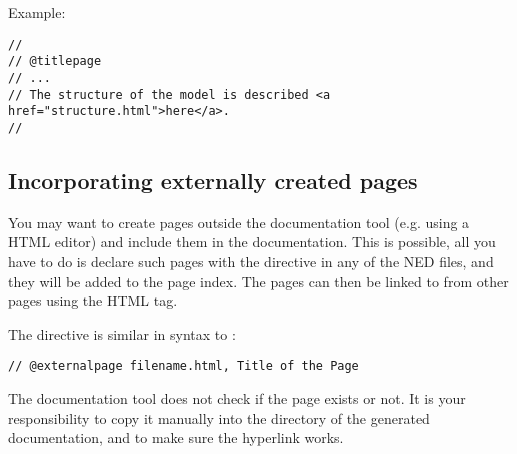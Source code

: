 Example:
\begin{verbatim}
//
// @titlepage
// ...
// The structure of the model is described <a href="structure.html">here</a>.
//
\end{verbatim}


\subsection{Incorporating externally created pages}

You may want to create pages outside the documentation tool
(e.g. using a HTML editor) and include them in the documentation.
This is possible, all you have to do is declare such pages with
the  directive in any of the NED files, and
they will be added to the page index. The pages can then be linked to
from other pages using the HTML  tag.

The  directive is similar in syntax to :

\begin{verbatim}
// @externalpage filename.html, Title of the Page
\end{verbatim}

The documentation tool does not check if the page exists
or not. It is your responsibility to copy it manually into
the directory of the generated documentation, and to make
sure the hyperlink works.


